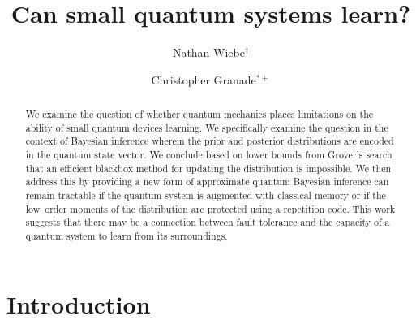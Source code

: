 \documentclass[aps,amsmath,onecolumn,amssymb]{revtex4}
\begin{document}
\newcommand{\id}{\openone}


\title{Can small quantum systems learn?}
\author{Nathan Wiebe$^\dagger$}
\author{Christopher Granade$^{*+}$}
\begin{abstract}
We examine the question of whether quantum mechanics places limitations on the ability of small quantum devices learning.  We specifically examine the question in the context of Bayesian inference wherein the prior and posterior distributions are encoded in the quantum state vector.  We conclude based on lower bounds from Grover's search that an efficient blackbox method for updating the distribution is impossible.  We then address this by providing a new form of approximate quantum Bayesian inference can remain tractable if the quantum system is augmented with classical memory or if the low--order moments of the distribution are protected using a repetition code.  This work suggests that there may be a connection between fault tolerance and the capacity of a quantum system to learn from its surroundings.
\end{abstract}
\maketitle
\section{Introduction}
\end{document}
